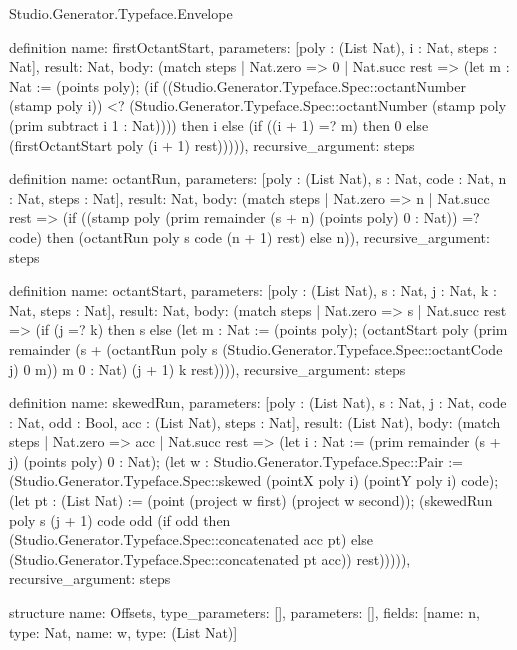 \begin{lexlean}{Studio.Generator.Typeface.Envelope}
\begin{semanticmodule}
definition{
  name: firstOctantStart,
  parameters: [poly : (List Nat), i : Nat, steps : Nat],
  result: Nat,
  body: (match steps
    | Nat.zero => 0
    | Nat.succ rest => (let m : Nat := (points poly); (if ((Studio.Generator.Typeface.Spec::octantNumber (stamp poly i)) <? (Studio.Generator.Typeface.Spec::octantNumber (stamp poly (prim subtract i 1 : Nat)))) then i else (if ((i + 1) =? m) then 0 else (firstOctantStart poly (i + 1) rest))))),
  recursive_argument: steps
}

definition{
  name: octantRun,
  parameters: [poly : (List Nat), s : Nat, code : Nat, n : Nat, steps : Nat],
  result: Nat,
  body: (match steps
    | Nat.zero => n
    | Nat.succ rest => (if ((stamp poly (prim remainder (s + n) (points poly) 0 : Nat)) =? code) then (octantRun poly s code (n + 1) rest) else n)),
  recursive_argument: steps
}

definition{
  name: octantStart,
  parameters: [poly : (List Nat), s : Nat, j : Nat, k : Nat, steps : Nat],
  result: Nat,
  body: (match steps
    | Nat.zero => s
    | Nat.succ rest => (if (j =? k) then s else (let m : Nat := (points poly); (octantStart poly (prim remainder (s + (octantRun poly s (Studio.Generator.Typeface.Spec::octantCode j) 0 m)) m 0 : Nat) (j + 1) k rest)))),
  recursive_argument: steps
}

definition{
  name: skewedRun,
  parameters: [poly : (List Nat), s : Nat, j : Nat, code : Nat, odd : Bool, acc : (List Nat), steps : Nat],
  result: (List Nat),
  body: (match steps
    | Nat.zero => acc
    | Nat.succ rest => (let i : Nat := (prim remainder (s + j) (points poly) 0 : Nat); (let w : Studio.Generator.Typeface.Spec::Pair := (Studio.Generator.Typeface.Spec::skewed (pointX poly i) (pointY poly i) code); (let pt : (List Nat) := (point (project w first) (project w second)); (skewedRun poly s (j + 1) code odd (if odd then (Studio.Generator.Typeface.Spec::concatenated acc pt) else (Studio.Generator.Typeface.Spec::concatenated pt acc)) rest))))),
  recursive_argument: steps
}

structure{
  name: Offsets,
  type_parameters: [],
  parameters: [],
  fields: [{name: n, type: Nat}, {name: w, type: (List Nat)}]
}


\end{semanticmodule}
\end{lexlean}
